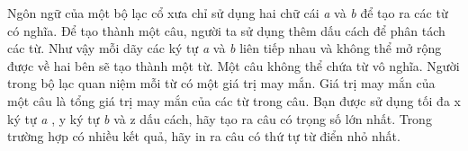 Ngôn ngữ của một bộ lạc cổ xưa chỉ sử dụng hai chữ cái \emph{ a } và \emph{ b } để tạo ra các từ có nghĩa. Để tạo thành một câu, người ta sử dụng thêm dấu cách để phân tách các từ. Như vậy mỗi dãy các ký tự \emph{ a } và \emph{ b } liên tiếp nhau và không thể mở rộng được về hai bên sẽ tạo thành một từ. Một câu không thể chứa từ vô nghĩa. Người trong bộ lạc quan niệm mỗi từ có một giá trị may mắn. Giá trị may mắn của một câu là tổng giá trị may mắn của các từ trong câu. Bạn được sử dụng tối đa x ký tự \emph{ a } , y ký tự \emph{ b } và z dấu cách, hãy tạo ra câu có trọng số lớn nhất. Trong trường hợp có nhiều kết quả, hãy in ra câu có thứ tự từ điển nhỏ nhất.